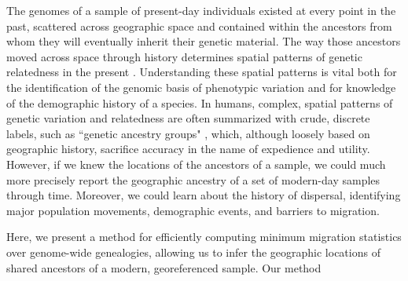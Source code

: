 The genomes of a sample of present-day individuals existed at every point in the past, 
scattered across geographic space and contained within the ancestors 
from whom they will eventually inherit their genetic material.
The way those ancestors moved across space through history 
determines spatial patterns of genetic relatedness in the present \citep{Bradburd_Ralph_2019}.
Understanding these spatial patterns is vital both for 
the identification of the genomic basis of phenotypic variation 
and for 
knowledge of the demographic history of a species.
In humans, 
complex, spatial patterns of genetic variation and relatedness 
are often summarized with crude, discrete labels, 
such as ``genetic ancestry groups" \citep{Coop_2022}, 
which, although loosely based on geographic history, 
sacrifice accuracy in the name of expedience and utility.
However, if we knew the locations of the ancestors of a sample, 
we could much more precisely report the geographic ancestry 
of a set of modern-day samples through time.
Moreover, we could learn about the history of dispersal, 
identifying major population movements, 
demographic events, and 
barriers to migration.

Here, we present a method for efficiently computing 
minimum migration statistics over genome-wide genealogies, 
allowing us to infer the geographic locations of shared ancestors 
of a modern, georeferenced sample.
Our method 


